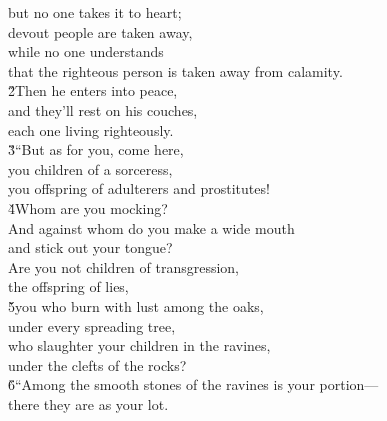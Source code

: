 \begin{poetry}
\poemll    but no one takes it to heart; \\
\poeml devout people are taken away, \\
\poemll    while no one understands \\
\poemlll       that the righteous person is taken away from calamity. \\
\poeml \v{2}Then he enters into peace, \\
\poemll    and they'll rest on his couches, \\
\poemlll       each one living righteously. \\
\poeml \v{3}``But as for you, come here, \\
\poemll    you children of a sorceress, \\
\poemlll       you offspring of adulterers and prostitutes! \\
\poeml \v{4}Whom are you mocking? \\
\poemll    And against whom do you make a wide mouth \\
\poemlll       and stick out your tongue? \\
\poeml Are you not children of transgression, \\
\poemll    the offspring of lies, \\
\poeml \v{5}you who burn with lust among the oaks, \\
\poemll    under every spreading tree, \\
\poeml who slaughter your children in the ravines, \\
\poemll    under the clefts of the rocks? \\
\poeml \v{6}``Among the smooth stones of the ravines is your portion--- \\
\poemll    there they are as your lot. \\

\end{poetry}
